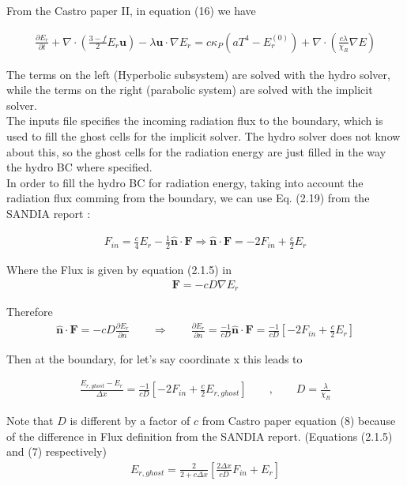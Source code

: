 \documentclass[11pt]{article}
\begin{document}
	
	From the Castro paper II, \cite{castroGray} in equation (16) we have
	
	\begin{align*}	
	 \frac{\partial E_r}{\partial t} + \nabla \cdot \left( \frac{3-f}{2} E_r \bm{u}\right) - \lambda \bm{u} \cdot \nabla E_r = c \kappa_P \left( a T^4 - E^{(0)}_r\right) + \nabla \cdot \left( \frac{c\lambda}{\chi_R} \nabla E\right) 
	\end{align*}

The terms on the left (Hyperbolic subsystem) are solved with the hydro solver, while the terms on the right (parabolic system) are solved with the implicit solver. \\

The inputs file specifies the incoming radiation flux to the boundary, which is used to fill the ghost cells for the implicit solver. The hydro solver does not know about this, so the ghost cells for the radiation energy are just filled in the way the hydro BC where specified. \\

In order to fill the hydro BC for radiation energy, taking into account the radiation flux comming from the boundary, we can use Eq. (2.19) from the SANDIA report \cite{advinrad} :

\begin{align*}
	F_{in} = \frac{c}{4}E_r - \frac{1}{2} \bm{\hat{n}} \cdot \bm{F} \Rightarrow
	\bm{\hat{n}} \cdot \bm{F} = -2 F_{in} + \frac{c}{2} E_r
\end{align*}

Where the Flux is given by equation (2.1.5) in \cite{advinrad} 
\begin{align*}
	\bm{F} = -c D \nabla E_r
\end{align*}
 
 Therefore
\begin{align*}
	\bm{\hat{n}} \cdot \bm{F} = -cD \frac{\partial E_r}{\partial n}
	\qquad
	\Rightarrow
	\qquad
	\frac{\partial E_r}{\partial n} = \frac{-1}{cD} \bm{\hat{n}} \cdot \bm{F} = \frac{-1}{cD} \left[ -2 F_{in} + \frac{c}{2} E_r\right]
\end{align*}

Then at the boundary, for let's say coordinate x this leads to   
 
	 \begin{align*}
	 	\frac{E_{r,ghost} - E_{r}}{\Delta x} =  \frac{-1}{cD} \left[ -2 F_{in} + \frac{c}{2} E_{r,ghost}\right]
	 	\qquad ,
	 	\qquad
	 	D = \frac{\lambda}{\chi_R}
	 \end{align*}
	 
Note that $D$ is different by a factor of $c$ from Castro paper equation (8) because of the difference in Flux definition from the SANDIA report. (Equations (2.1.5) and (7) respectively) \\

	\begin{align*}
		E_{r,ghost} = \frac{2}{2+ c\Delta x} \left[ \frac{2 \Delta x}{cD} F_{in} + E_r\right]
	\end{align*}
	

	{}
    
\end{document}
